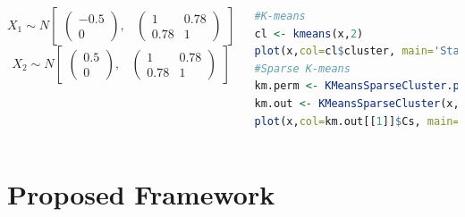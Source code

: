 \documentclass{beamer}
\begin{document}
\begin{frame}[fragile]
\begin{columns}[c]
\begin{equation*}
X_1 \sim N
\begin{bmatrix}
\begin{pmatrix}
-0.5\\
0
\end{pmatrix}\!\!,&
\begin{pmatrix}
1 & 0.78 \\
0.78 & 1
\end{pmatrix}
\end{bmatrix}
\end{equation*}
\begin{equation*}
X_2 \sim N
\begin{bmatrix}
\begin{pmatrix}
0.5\\
0
\end{pmatrix}\!\!,&
\begin{pmatrix}
1 & 0.78 \\
0.78 & 1
\end{pmatrix}
\end{bmatrix}
\end{equation*}

\begin{lstlisting}[language=R]
#K-means
cl <- kmeans(x,2)
plot(x,col=cl$cluster, main='Standard K-means')
#Sparse K-means
km.perm <- KMeansSparseCluster.permute(x,K=2,wbounds=seq(3,7,len=15),nperms=5)
km.out <- KMeansSparseCluster(x,K=2,wbounds=km.perm$bestw)
plot(x,col=km.out[[1]]$Cs, main='Sparse K-means')
\end{lstlisting}
\end{columns}
\end{frame}

\section{Proposed Framework}
\end{document}
